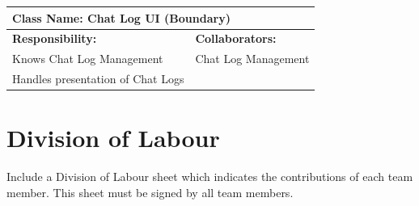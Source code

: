 \documentclass[]{article}
\begin{document}
\begin{table}[ht]
	\centering
	\begin{tabular}{|p{7cm}|p{7cm}|}
		\hline
		\multicolumn{2}{|l|}{\textbf{Class Name:} Chat Log UI (Boundary)} \\
		\hline
		\textbf{Responsibility:}          & \textbf{Collaborators:}       \\
		\hline
		Knows Chat Log Management         & Chat Log Management           \\
		Handles presentation of Chat Logs &                               \\
		\hline
	\end{tabular}
\end{table}



\appendix
\section{Division of Labour}
\label{sec:division_of_labour}
Include a Division of Labour sheet which indicates the contributions of each team member. This sheet must be signed by all team members.
\end{document}
